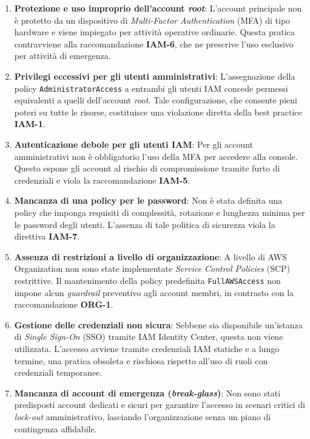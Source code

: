 \begin{enumerate}
    \item \textbf{Protezione e uso improprio dell'account \emph{root}}: L'account principale non è protetto da un dispositivo di \emph{Multi-Factor Authentication} (MFA) di tipo hardware e viene impiegato per attività operative ordinarie. Questa pratica contravviene alla raccomandazione \textbf{IAM-6}, che ne prescrive l'uso esclusivo per attività di emergenza.

    \item \textbf{Privilegi eccessivi per gli utenti amministrativi}: L'assegnazione della policy \texttt{AdministratorAccess} a entrambi gli utenti IAM concede permessi equivalenti a quelli dell'account \emph{root}. Tale configurazione, che consente pieni poteri su tutte le risorse, costituisce una violazione diretta della best practice \textbf{IAM-1}.

    \item \textbf{Autenticazione debole per gli utenti IAM}: Per gli account amministrativi non è obbligatorio l'uso della MFA per accedere alla console. Questo espone gli account al rischio di compromissione tramite furto di credenziali e viola la raccomandazione \textbf{IAM-5}.

    \item \textbf{Mancanza di una policy per le password}: Non è stata definita una policy che imponga requisiti di complessità, rotazione e lunghezza minima per le password degli utenti. L'assenza di tale politica di sicurezza viola la direttiva \textbf{IAM-7}.
    
    \item \textbf{Assenza di restrizioni a livello di organizzazione}: A livello di AWS Organization non sono state implementate \emph{Service Control Policies} (SCP) restrittive. Il mantenimento della policy predefinita \texttt{FullAWSAccess} non impone alcun \emph{guardrail} preventivo agli account membri, in contrasto con la raccomandazione \textbf{ORG-1}.

    \item \textbf{Gestione delle credenziali non sicura}: Sebbene sia disponibile un'istanza di \emph{Single Sign-On} (SSO) tramite IAM Identity Center, questa non viene utilizzata. L'accesso avviene tramite credenziali IAM statiche e a lungo termine, una pratica obsoleta e rischiosa rispetto all'uso di ruoli con credenziali temporanee.
    
    \item \textbf{Mancanza di account di emergenza (\emph{break-glass})}: Non sono stati predisposti account dedicati e sicuri per garantire l'accesso in scenari critici di \emph{lock-out} amministrativo, lasciando l'organizzazione senza un piano di contingenza affidabile.
\end{enumerate}
